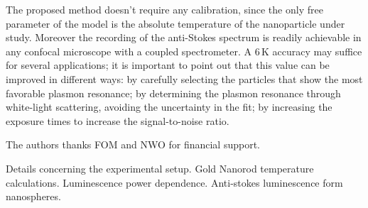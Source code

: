 \documentclass[journal=nalefd,manuscript=letter]{achemso}
\newcommand{\K}{\ensuremath{\,\textrm{K}}}
\begin{document}

The proposed method doesn't require any calibration, since the only free
parameter of the model is the absolute temperature of the nanoparticle under
study. Moreover the recording of the anti-Stokes spectrum is readily achievable
in any confocal microscope with a coupled spectrometer. A $6\K$ accuracy may
suffice for several applications; it is important to point out that this value
can be improved in different ways: by carefully selecting the particles that
show the most favorable plasmon resonance; by determining the plasmon resonance
through white-light scattering, avoiding the uncertainty in the fit; by
increasing the exposure times to increase the signal-to-noise ratio.

\begin{acknowledgement}

The authors thanks FOM and NWO for financial support.

\end{acknowledgement}

\begin{suppinfo}

Details concerning the experimental setup. Gold Nanorod temperature calculations.
Luminescence power dependence. Anti-stokes luminescence form nanospheres.


\end{suppinfo}



\end{document}
